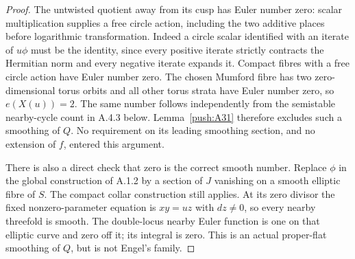 \begin{proof}
The untwisted quotient away from its cusp has Euler number zero:
scalar multiplication supplies a free circle action, including
the two additive places before logarithmic transformation. Indeed
a circle scalar identified with an iterate of $u\phi$ must be
the identity, since every positive iterate strictly contracts
the Hermitian norm and every negative iterate expands it.
Compact fibres with a free circle action have Euler number zero.
The chosen Mumford fibre has two zero-dimensional torus orbits
and all other torus strata have Euler number zero, so
$e(X(u))=2$. The same number follows independently from the
semistable nearby-cycle count in A.4.3 below. Lemma~\ref{push:A31}
therefore excludes such a smoothing of $Q$. No requirement
on its leading smoothing section, and no extension of $f$,
entered this argument.

There is also a direct check that zero is the correct smooth
number. Replace $\phi$ in the global construction of A.1.2
by a section of $J$ vanishing on a smooth elliptic fibre of
$S$. The compact collar construction still applies. At its
zero divisor the fixed nonzero-parameter equation is $xy=uz$
with $dz\ne0$, so every nearby threefold is smooth. The
double-locus nearby Euler function is one on that elliptic
curve and zero off it; its integral is zero. This is an actual
proper-flat smoothing of $Q$, but is not Engel's family.
\end{proof}

